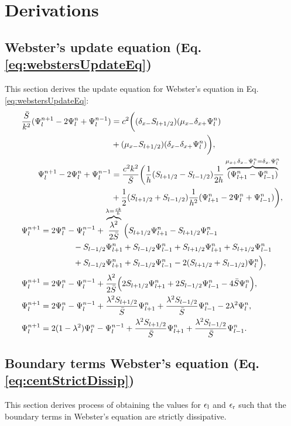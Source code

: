 \chapter{Derivations}\label{app:derivations}
\def\Psilp{\Psi_{l+1}^n}
\def\Psilm{\Psi_{l-1}^n}
\def\Psinp{\Psi_l^{n+1}}
\def\Psinm{\Psi_l^{n-1}}

\section{Webster's update equation (Eq. \eqref{eq:webstersUpdateEq})}\label{app:webstersUpdateEq}
This section derives the update equation for Webster's equation in Eq. \eqref{eq:webstersUpdateEq}:
\begin{align*}
    &\begin{aligned}
    \frac{\Sbar}{k^2}(\Psi_l^{n+1} - 2\Psiln+\Psi_l^{n-1}) &= c^2\bigg((\dxm \Sp)(\mxm \dxp \Psiln)\\
    & + (\mxm \Sp)(\dxm \dxp \Psiln)\bigg),\\
    \Psinp - 2\Psiln+\Psinm &= \frac{c^2k^2}{\Sbar}\bigg(\frac{1}{h}(\Sp - \Sm)\frac{1}{2h}\overbrace{(\Psilp -\Psilm)}^{\mxp\dxm\Psiln = \delta_{x\cdot}\Psiln}\nonumber\\
    &+\frac{1}{2}(\Sp + \Sm)\frac{1}{h^2}(\Psilp-2\Psiln+\Psilm)\bigg),
    \end{aligned}\\[-0.5em]
    &\begin{aligned}
        \Psinp &= 2\Psiln -\Psinm +\overbrace{\frac{\lambda^2}{2\Sbar}}^{\lambda = \frac{ck}{h}}\Big(\Sp\Psilp - \Sp\Psilm\\
        &\qquad\qquad - \Sm\Psilp + \Sm\Psilm+ \Sp\Psilp + \Sp\Psilm \\
        &\qquad\qquad + \Sm\Psilp + \Sm\Psilm - 2 (\Sp + \Sm)\Psiln\Big)\nonumber,\\
        \Psinp &= 2\Psiln-\Psinm+ \frac{\lambda^2}{2\Sbar}\Big(2\Sp\Psilp + 2\Sm\Psilm - 4\Sbar\Psiln\Big)\nonumber,\\
        \Psinp &= 2\Psiln-\Psinm+ \frac{\lambda^2\Sp}{\Sbar}\Psilp + \frac{\lambda^2\Sm}{\Sbar}\Psilm - 2\lambda^2\Psiln\nonumber,\\
        \Psinp &= 2(1-\lambda^2)\Psiln-\Psinm+ \frac{\lambda^2\Sp}{\Sbar}\Psilp + \frac{\lambda^2\Sm}{\Sbar}\Psilm.
    \end{aligned}
\end{align*}

\section{Boundary terms Webster's equation (Eq. \eqref{eq:centStrictDissip})}\label{app:boundaryWebster}
This section derives process of obtaining the values for $\epsilon_\text{l}$ and $\epsilon_\text{r}$ such that the boundary terms in Webster's equation are strictly dissipative. 

